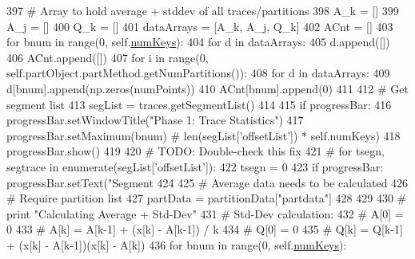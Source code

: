 \begin{DoxyCode}
397             \textcolor{comment}{# Array to hold average + stddev of all traces/partitions}
398             A\_k = []
399             A\_j = []
400             Q\_k = []
401             dataArrays = [A\_k, A\_j, Q\_k]
402             ACnt = []
403             \textcolor{keywordflow}{for} bnum \textcolor{keywordflow}{in} range(0, self.\hyperlink{classsoftware_1_1chipwhisperer_1_1analyzer_1_1utils_1_1TraceExplorerScripts_1_1PartitionDisplay_1_1PartitionDisplay_a9609f827035095f248787dbde121fa08}{numKeys}):
404                 \textcolor{keywordflow}{for} d \textcolor{keywordflow}{in} dataArrays:
405                     d.append([])
406                 ACnt.append([])
407                 \textcolor{keywordflow}{for} i \textcolor{keywordflow}{in} range(0, self.partObject.partMethod.getNumPartitions()):
408                     \textcolor{keywordflow}{for} d \textcolor{keywordflow}{in} dataArrays:
409                         d[bnum].append(np.zeros(numPoints))
410                     ACnt[bnum].append(0)
411 
412             \textcolor{comment}{# Get segment list}
413             segList = traces.getSegmentList()
414 
415             \textcolor{keywordflow}{if} progressBar:
416                 progressBar.setWindowTitle(\textcolor{stringliteral}{"Phase 1: Trace Statistics"})
417                 progressBar.setMaximum(bnum)  \textcolor{comment}{# len(segList['offsetList']) * self.numKeys)}
418                 progressBar.show()
419 
420             \textcolor{comment}{# TODO: Double-check this fix}
421             \textcolor{comment}{# for tsegn, segtrace in enumerate(segList['offsetList']):}
422             tsegn = 0
423             \textcolor{keywordflow}{if} progressBar: progressBar.setText(\textcolor{stringliteral}{"Segment %
424 
425             \textcolor{comment}{# Average data needs to be calculated}
426             \textcolor{comment}{# Require partition list}
427             partData = partitionData[\textcolor{stringliteral}{"partdata"}]
428 
429 
430             \textcolor{comment}{# print "Calculating Average + Std-Dev"}
431             \textcolor{comment}{# Std-Dev calculation:}
432             \textcolor{comment}{# A[0] = 0}
433             \textcolor{comment}{# A[k] = A[k-1] + (x[k] - A[k-1]) / k}
434             \textcolor{comment}{# Q[0] = 0}
435             \textcolor{comment}{# Q[k] = Q[k-1] + (x[k] - A[k-1])(x[k] - A[k])}
436             \textcolor{keywordflow}{for} bnum \textcolor{keywordflow}{in} range(0, self.\hyperlink{classsoftware_1_1chipwhisperer_1_1analyzer_1_1utils_1_1TraceExplorerScripts_1_1PartitionDisplay_1_1PartitionDisplay_a9609f827035095f248787dbde121fa08}{numKeys}):
}
\end{DoxyCode}
